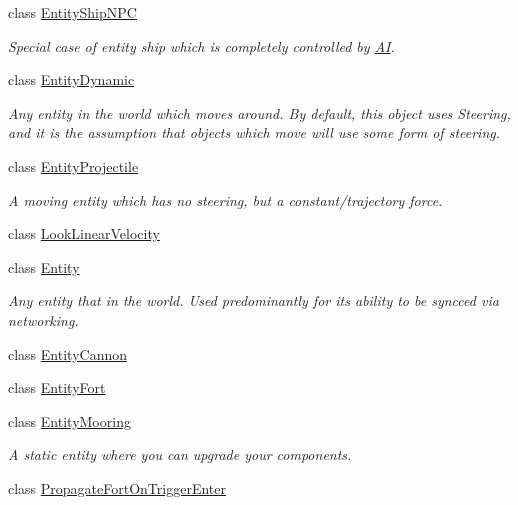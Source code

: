 \begin{DoxyCompactItemize}
class \hyperlink{class_skyrates_1_1_entity_1_1_entity_ship_n_p_c}{Entity\-Ship\-N\-P\-C}
\begin{DoxyCompactList}\small\item\em Special case of entity ship which is completely controlled by \hyperlink{namespace_skyrates_1_1_a_i}{A\-I}. \end{DoxyCompactList}\item 
class \hyperlink{class_skyrates_1_1_entity_1_1_entity_dynamic}{Entity\-Dynamic}
\begin{DoxyCompactList}\small\item\em Any entity in the world which moves around. By default, this object uses Steering, and it is the assumption that objects which move will use some form of steering. \end{DoxyCompactList}\item 
class \hyperlink{class_skyrates_1_1_entity_1_1_entity_projectile}{Entity\-Projectile}
\begin{DoxyCompactList}\small\item\em A moving entity which has no steering, but a constant/trajectory force. \end{DoxyCompactList}\item 
class \hyperlink{class_skyrates_1_1_entity_1_1_look_linear_velocity}{Look\-Linear\-Velocity}
\item 
class \hyperlink{class_skyrates_1_1_entity_1_1_entity}{Entity}
\begin{DoxyCompactList}\small\item\em Any entity that in the world. Used predominantly for its ability to be syncced via networking. \end{DoxyCompactList}\item 
class \hyperlink{class_skyrates_1_1_entity_1_1_entity_cannon}{Entity\-Cannon}
\item 
class \hyperlink{class_skyrates_1_1_entity_1_1_entity_fort}{Entity\-Fort}
\item 
class \hyperlink{class_skyrates_1_1_entity_1_1_entity_mooring}{Entity\-Mooring}
\begin{DoxyCompactList}\small\item\em A static entity where you can upgrade your components. \end{DoxyCompactList}\item 
class \hyperlink{class_skyrates_1_1_entity_1_1_propagate_fort_on_trigger_enter}{Propagate\-Fort\-On\-Trigger\-Enter}
\end{DoxyCompactItemize}
